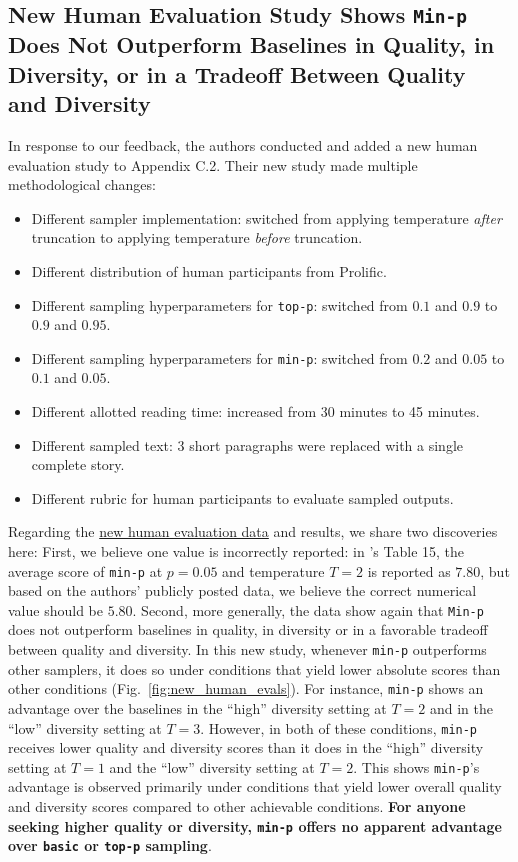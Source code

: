 \subsection{New Human Evaluation Study Shows \texttt{Min-p} Does Not Outperform Baselines in Quality, in Diversity, or in a Tradeoff Between Quality and Diversity}
\label{sec:human_evals:subset:new_exp}

In response to our feedback, the authors conducted and added a new human evaluation study to Appendix C.2.
Their new study made multiple methodological changes:
%
\begin{itemize}
    \item Different sampler implementation: switched from applying temperature \textit{after} truncation to applying temperature \textit{before} truncation.
    \item Different distribution of human participants from Prolific.
    \item Different sampling hyperparameters for \texttt{top-p}: switched from $0.1$ and $0.9$ to $0.9$ and $0.95$.
    \item Different sampling hyperparameters for \texttt{min-p}: switched from $0.2$ and $0.05$ to $0.1$ and $0.05$.
    \item Different allotted reading time: increased from 30 minutes to 45 minutes.
    \item Different sampled text: 3 short paragraphs were replaced with a single complete story.
    \item Different rubric for human participants to evaluate sampled outputs.
\end{itemize}
%
Regarding the \href{https://github.com/menhguin/minp_paper/blob/main/%5BLIVE%5D%20min_p%20user%20preference%20study%20v3.0%20(Responses)%20-%20Form%20responses%201.csv}{new human evaluation data} and results, we share two discoveries here: First, we believe one value is incorrectly reported: in \citet{nguyen2024minp}'s Table 15, the average score of \texttt{min-p} at $p=0.05$ and temperature $T=2$ is reported as $7.80$, but based on the authors' publicly posted data, we believe the correct numerical value should be $5.80$. Second, more generally, the data show again that \texttt{Min-p} does not outperform baselines in quality, in diversity or in a favorable tradeoff between quality and diversity. In this new study, whenever \texttt{min-p} outperforms other samplers, it does so under conditions that yield lower absolute scores than other conditions (Fig.~\ref{fig:new_human_evals}). For instance, \texttt{min-p} shows an advantage over the baselines in the ``high'' diversity setting at $T=2$ and in the ``low'' diversity setting at $T=3$. However, in both of these conditions, \texttt{min-p} receives lower quality and diversity scores than it does in the ``high'' diversity setting at $T=1$ and the ``low'' diversity setting at $T=2$. This shows \texttt{min-p}'s advantage is observed primarily under conditions that yield lower overall quality and diversity scores compared to other achievable conditions. \textbf{For anyone seeking higher quality or diversity, \texttt{min-p} offers no apparent advantage over \texttt{basic} or \texttt{top-p} sampling}.
